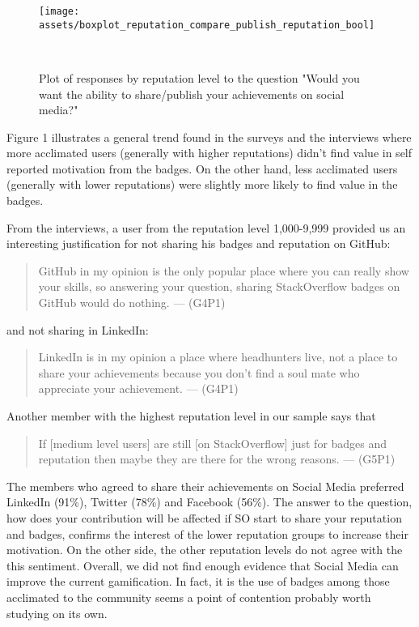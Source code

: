 \documentclass{sigchi}
\begin{document}
\begin{figure}
	\centering
	\texttt{[image: assets/boxplot\_reputation\_compare\_publish\_reputation\_bool]}
	\caption{Plot of responses by reputation level to the question "Would you want the ability to share/publish your achievements on social media?"}~\label{fig:figure1}
\end{figure}

Figure 1 illustrates a general trend found in the surveys and the interviews where more acclimated users (generally with higher reputations) didn't find value in self reported motivation from the badges. On the other hand, less acclimated users (generally with lower reputations) were slightly more likely to find value in the badges.

From the interviews, a user from the reputation level 1,000-9,999 provided us an interesting justification for not sharing his badges and reputation on GitHub:
\begin{quote}
GitHub in my opinion is the only popular place where you can really show your skills, so answering your question, sharing StackOverflow badges on GitHub would do nothing. --- (G4P1)
\end{quote}
and not sharing in LinkedIn:
\begin{quote}
LinkedIn is in my opinion a place where headhunters live, not a place to share your achievements because you don’t find a soul mate who appreciate your achievement. --- (G4P1)
\end{quote}
Another member with the highest reputation level in our sample says that
\begin{quote}
If [medium level users] are still [on StackOverflow] just for badges and reputation then maybe they are there for the wrong reasons. --- (G5P1)
\end{quote}

The members who agreed to share their achievements on Social Media preferred LinkedIn (91\%), Twitter (78\%) and Facebook (56\%). The answer to the question, how does your contribution will be affected if SO start to share your reputation and badges, confirms the interest of the lower reputation groups to increase their motivation. On the other side, the other reputation levels do not agree with the this sentiment. Overall, we did not find enough evidence that Social Media can improve the current gamification. In fact, it is the use of badges among those acclimated to the community seems a point of contention probably worth studying on its own.
\end{document}
